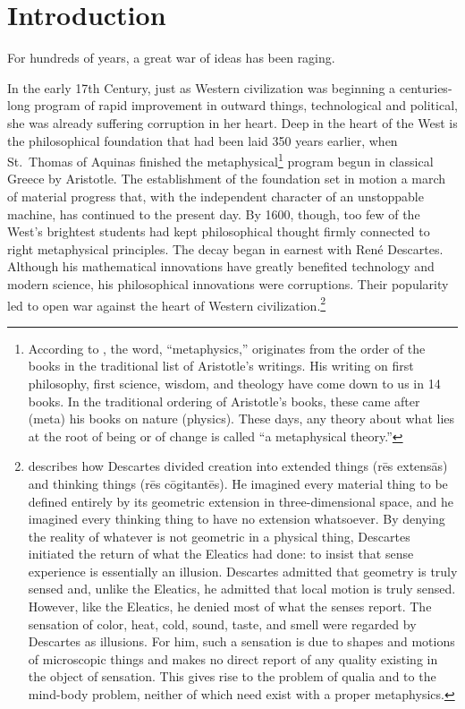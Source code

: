 \documentclass[twocolumn]{article}
\begin{document}
\thispagestyle{fancy}

\section{Introduction}

For hundreds of years, a great war of ideas has been raging.

In the early 17th Century, just as Western civilization was beginning a
centuries-long program of rapid improvement in outward things, technological
and political, she was already suffering corruption in her heart.  Deep in the
heart of the West is the philosophical foundation that had been laid 350 years
earlier, when St.~Thomas of Aquinas finished the metaphysical\footnote{%
   According to \cite{vis2017}, the word, ``metaphysics,'' originates from the
   order of the books in the traditional list of Aristotle's writings.  His
   writing on first philosophy, first science, wisdom, and theology have come
   down to us in 14 books.  In the traditional ordering of Aristotle's books,
   these came after (meta) his books on nature (physics).  These days, any
   theory about what lies at the root of being or of change is called ``a
   metaphysical theory.''%
}
program begun in classical Greece by Aristotle.  The establishment of the
foundation set in motion a march of material progress that, with the
independent character of an unstoppable machine, has continued to the present
day.  By 1600, though, too few of the West's brightest students had kept
philosophical thought firmly connected to right metaphysical principles.  The
decay began in earnest with Ren\'e Descartes.  Although his mathematical
innovations have greatly benefited technology and modern science, his
philosophical innovations were corruptions.  Their popularity led to open war
against the heart of Western civilization.\footnote{%
   \citet[Chapter IV]{b1954} describes how Descartes divided creation into
   extended things (r\={e}s extens\={a}s) and thinking things (r\={e}s
   c\={o}gitant\={e}s). He imagined every material thing to be defined entirely
   by its geometric extension in three-dimensional space, and he imagined every
   thinking thing to have no extension whatsoever.  By denying the reality of
   whatever is not geometric in a physical thing, Descartes initiated the
   return of what the Eleatics had done: to insist that sense experience is
   essentially an illusion.  Descartes admitted that geometry is truly sensed
   and, unlike the Eleatics, he admitted that local motion is truly sensed.
   However, like the Eleatics, he denied most of what the senses report. The
   sensation of color, heat, cold, sound, taste, and smell were regarded by
   Descartes as illusions.  For him, such a sensation is due to shapes and
   motions of microscopic things and makes no direct report of any quality
   existing in the object of sensation.  This gives rise to the problem of
   qualia and to the mind-body problem, neither of which need exist with a
   proper metaphysics.
}
\end{document}
